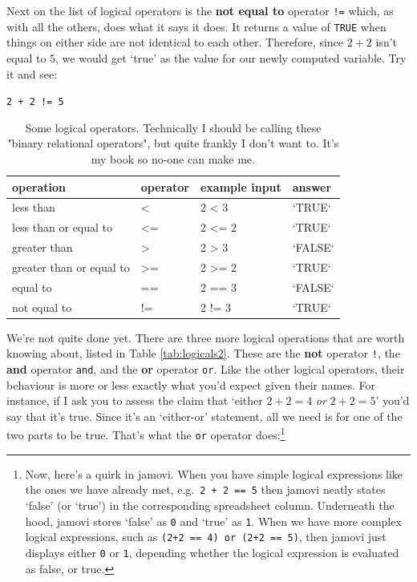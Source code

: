 \documentclass[
]{book}
\begin{document}
Next on the list of logical operators is the {\textbf{not equal to}} operator \texttt{!=} which, as with all the others, does what it says it does. It returns a value of \texttt{TRUE} when things on either side are not identical to each other. Therefore, since \(2+2\) isn't equal to \(5\), we would get `true' as the value for our newly computed variable. Try it and see:

\texttt{2\ +\ 2\ !=\ 5}

\begin{table}

\caption{\label{tab:logicaltab}Some logical operators. Technically I should be calling these "binary relational operators", but quite frankly I don't want to. It's my book so no-one can make me.}
\centering
\begin{tabular}[t]{llll}
\toprule
operation & operator & example input & answer\\
\midrule
less than & < & 2 < 3 & `TRUE`\\
less than or equal to & <= & 2 <= 2 & `TRUE`\\
greater than & > & 2 > 3 & `FALSE`\\
greater than or equal to & >= & 2 >= 2 & `TRUE`\\
equal to & == & 2 == 3 & `FALSE`\\
\addlinespace
not equal to & != & 2 != 3 & `TRUE`\\
\bottomrule
\end{tabular}
\end{table}

We're not quite done yet. There are three more logical operations that are worth knowing about, listed in Table \ref{tab:logicals2}. These are the {\textbf{not}} operator \texttt{!}, the {\textbf{and}} operator \texttt{and}, and the {\textbf{or}} operator \texttt{or}. Like the other logical operators, their behaviour is more or less exactly what you'd expect given their names. For instance, if I ask you to assess the claim that `either \(2+2 = 4\) \emph{or} \(2+2 = 5\)' you'd say that it's true. Since it's an `either-or' statement, all we need is for one of the two parts to be true. That's what the \texttt{or} operator does:\footnote{Now, here's a quirk in jamovi. When you have simple logical expressions like the ones we have already met, e.g.~\texttt{2\ +\ 2\ ==\ 5} then jamovi neatly states `false' (or `true') in the corresponding spreadsheet column. Underneath the hood, jamovi stores `false' as \texttt{0} and `true' as \texttt{1}. When we have more complex logical expressions, such as \texttt{(2+2\ ==\ 4)\ or\ (2+2\ ==\ 5)}, then jamovi just displays either \texttt{0} or \texttt{1}, depending whether the logical expression is evaluated as false, or true.}
\end{document}
